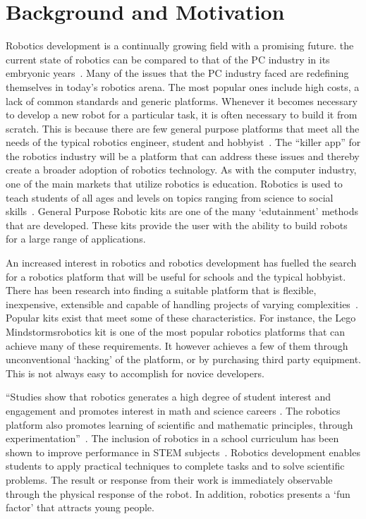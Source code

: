 \chapter{Background and Motivation} %
\label{cha:background_and_motivation}

Robotics development is a continually growing field with a promising future. the
current state of robotics can be compared to that of the PC industry in its
embryonic years~\parencite{billgates}. Many of the issues that the PC industry faced are redefining
themselves in today's robotics arena. The most popular ones include high costs, a lack
of common standards and generic platforms. Whenever it becomes necessary to
develop a new robot for a particular task, it is often necessary to build
it from scratch. This is because there are few general purpose platforms that meet
all the needs of the typical robotics engineer, student and hobbyist~\parencite{r2p}. The
``killer app'' for the robotics industry will be a platform that can address these issues
and thereby create a broader adoption of robotics technology. As with the
computer industry, one of the main markets that utilize robotics is education.
Robotics is used to teach students of all ages and levels on topics ranging from
science to social skills~\parencite{kramer}. General Purpose Robotic kits are one of the many
`edutainment' methods that are developed. These kits provide the user with the
ability to build robots for a large range of applications.

An increased interest in robotics and robotics development has fuelled 
the search for a robotics platform that will be useful for schools and the 
typical hobbyist. There has been research into finding a suitable
platform that is flexible, inexpensive, extensible and capable of handling
projects of varying complexities~\parencite{bot-mate}. Popular kits exist that meet some of
these characteristics. For instance, the Lego Mindstorms\texttrademark  robotics
kit is one of the most popular robotics platforms that can achieve many of these
requirements. It however achieves a few of them through unconventional
`hacking' of the platform, or by purchasing third party equipment. This is not
always easy to accomplish for novice developers. 

``Studies show that robotics generates a high degree of student interest and engagement and
promotes interest in math and science careers .  The robotics platform also promotes learning 
of scientific and mathematic principles, through experimentation''~\parencite{barker}.
The  inclusion of robotics in a school curriculum has been
shown to improve performance in STEM subjects~\parencite{school}. 
Robotics development enables students to apply practical techniques to complete tasks and 
to solve scientific problems. The result or response from their work is
immediately observable through the physical response of the robot. In addition,
robotics  presents a `fun factor' that attracts young people.

